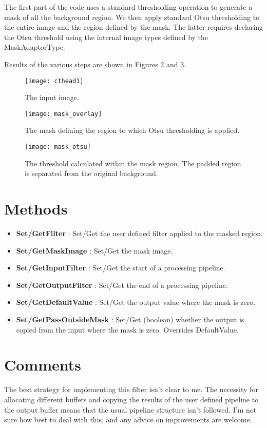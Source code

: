 \documentclass{InsightArticle}
\begin{document}
The first part of the code uses a standard thresholding operation to
generate a mask of all the background region. We then apply standard
Otsu thresholding to the entire image and the region defined by the
mask. The latter requires declaring the Otsu threshold using the
internal image types defined by the MaskAdaptorType.

Results of the various steps are shown in Figures \ref{mask} and
\ref{maskotsu}. 

\begin{figure}[htbp]
\centering
\texttt{[image: cthead1]}
\caption{The input image.\label{cthead1}}
\end{figure}

\begin{figure}[htbp]
\centering
\texttt{[image: mask\_overlay]}
\caption{The mask defining the region to which Otsu thresholding is applied.\label{mask}}
\end{figure}

\begin{figure}[htbp]
\centering
\texttt{[image: mask\_otsu]}
\caption{The threshold calculated within the mask region. The padded region is separated from the original background.\label{maskotsu}}
\end{figure}

\section{Methods}
\begin{itemize}
\item {\bf Set/GetFilter} : Set/Get the user defined filter applied to the masked region.
\item {\bf Set/GetMaskImage} : Set/Get the mask image.
\item {\bf Set/GetInputFilter} : Set/Get the start of a processing pipeline.
\item {\bf Set/GetOutputFilter} : Set/Get the end of a processing pipeline.
\item {\bf Set/GetDefaultValue} : Set/Get the output value where the mask is zero.
\item {\bf Set/GetPassOutsideMask} : Set/Get (boolean) whether the output is copied from the input where the mask is zero. Overrides DefaultValue.
\end{itemize}


\section{Comments}
The best strategy for implementing this filter isn't clear to me. The
necessity for allocating different buffers and copying the results of
the user defined pipeline to the output buffer means that the usual
pipeline structure isn't followed. I'm not sure how best to deal with
this, and any advice on improvements are welcome.





\nocite{ITKSoftwareGuide}
\end{document}
